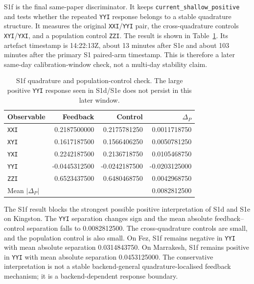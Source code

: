 \documentclass[preprint,aps,physrev,superscriptaddress,floatfix,longbibliography]{revtex4-2}
\begin{document}
S1f is the final same-paper discriminator. It keeps
\texttt{current\_shallow\_positive} and tests whether the repeated
\texttt{YYI} response belongs to a stable quadrature structure. It measures
the original \texttt{XXI}/\texttt{YYI} pair, the cross-quadrature controls
\texttt{XYI}/\texttt{YXI}, and a population control \texttt{ZZI}. The result
is shown in Table~\ref{tab:s1f}. Its artefact timestamp is 14:22:13Z, about
13 minutes after S1e and about 103 minutes after the primary S1 paired-arm
timestamp. This is therefore a later same-day calibration-window check, not a
multi-day stability claim.

\begin{table}[tb]
\centering
\begin{tabular}{lrrr}
\toprule
Observable & Feedback & Control & $\Delta_P$ \\
\midrule
\texttt{XXI} & 0.2187500000 & 0.2175781250 & 0.0011718750 \\
\texttt{XYI} & 0.1617187500 & 0.1566406250 & 0.0050781250 \\
\texttt{YXI} & 0.2242187500 & 0.2136718750 & 0.0105468750 \\
\texttt{YYI} & -0.0445312500 & -0.0242187500 & -0.0203125000 \\
\texttt{ZZI} & 0.6523437500 & 0.6480468750 & 0.0042968750 \\
\midrule
Mean $|\Delta_P|$ & \multicolumn{2}{r}{ } & 0.0082812500 \\
\bottomrule
\end{tabular}
\caption{S1f quadrature and population-control check. The large positive
\texttt{YYI} response seen in S1d/S1e does not persist in this later window.}
\label{tab:s1f}
\end{table}

The S1f result blocks the strongest possible positive interpretation of S1d
and S1e on Kingston. The \texttt{YYI} separation changes sign and the mean
absolute feedback--control separation falls to 0.0082812500. The
cross-quadrature controls are small, and the population control is also small.
On Fez, S1f remains negative in \texttt{YYI} with mean absolute separation
0.0314843750. On Marrakesh, S1f remains positive in \texttt{YYI} with mean
absolute separation 0.0453125000. The conservative interpretation is not a
stable backend-general quadrature-localised feedback mechanism; it is a
backend-dependent response boundary.
\end{document}
